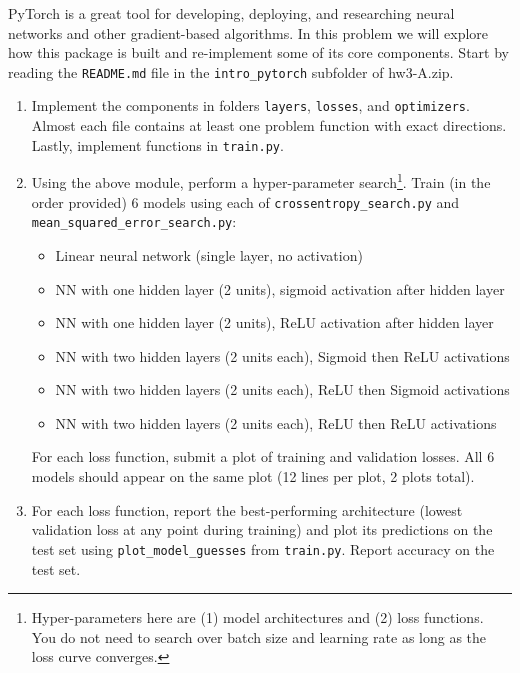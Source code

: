 \documentclass{article}
\begin{document}
\begin{aprob}
    \label{code-pytorch}
    PyTorch is a great tool for developing, deploying, and researching neural networks and other gradient-based algorithms.
    In this problem we will explore how this package is built and re-implement some of its core components.
    Start by reading the \texttt{README.md} file in the \texttt{intro\_pytorch} subfolder of hw3-A.zip.

    \begin{enumerate}
        \item {} Implement the components in folders \texttt{layers}, \texttt{losses}, and \texttt{optimizers}. Almost each file contains at least one problem function with exact directions. Lastly, implement functions in \texttt{train.py}.
        \item {} Using the above module, perform a hyper-parameter search\footnote{Hyper-parameters here are (1) model architectures and (2) loss functions. You do not need to search over batch size and learning rate as long as the loss curve converges.}. Train (in the order provided) 6 models using each of \texttt{crossentropy\_search.py} and \texttt{mean\_squared\_error\_search.py}:
        \begin{itemize}
            \item Linear neural network (single layer, no activation)
            \item NN with one hidden layer (2 units), sigmoid activation after hidden layer
            \item NN with one hidden layer (2 units), ReLU activation after hidden layer
            \item NN with two hidden layers (2 units each), Sigmoid then ReLU activations
            \item NN with two hidden layers (2 units each), ReLU then Sigmoid activations
            \item NN with two hidden layers (2 units each), ReLU then ReLU activations
        \end{itemize}
        For each loss function, submit a plot of training and validation losses. All 6 models should appear on the same plot (12 lines per plot, 2 plots total).
        \item {} For each loss function, report the best-performing architecture (lowest validation loss at any point during training) and plot its predictions on the test set using \texttt{plot\_model\_guesses} from \texttt{train.py}. Report accuracy on the test set.
    \end{enumerate}


\end{aprob}
\end{document}
